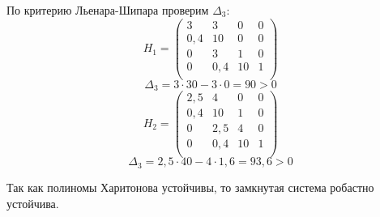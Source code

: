 \documentclass[../../TAU.tex]{subfiles}
\begin{document}
    По критерию Льенара-Шипара проверим $\Delta_3$:
    $$
        H_1=
        \begin{pmatrix}
            3 & 3 & 0 & 0 \\
            0{,}4 & 10 & 0 & 0 \\
            0 & 3 & 1 & 0 \\
            0 & 0{,}4 & 10 & 1 \\
        \end{pmatrix}
    $$
    $$
        \Delta_3=3\cdot30-3\cdot0=90>0
    $$
    $$
        H_2=
        \begin{pmatrix}
            2{,}5 & 4 & 0 & 0 \\
            0{,}4 & 10 & 1 & 0 \\
            0 & 2{,}5 & 4 & 0 \\
            0 & 0{,}4 & 10 & 1 \\
        \end{pmatrix}
    $$
    $$
        \Delta_3=2{,}5\cdot40-4\cdot1{,}6=93{,}6>0
    $$

    Так как полиномы Харитонова устойчивы, то замкнутая система робастно устойчива.
\end{document}
